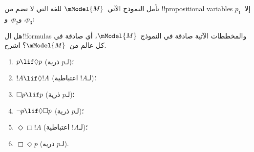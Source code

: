 \documentclass[../../../include/open-logic-section]{subfiles}
\begin{document}
\begin{prob}
  تأمل النموذج الآتي~$\mModel{M}$ للغة التي لا تضم من
  !!{propositional variable}s إلا~$p_1$، و$p_2$، و$p_3$:
  \begin{center}
  \end{center}
  هل ال!!{formula}s والمخططات الآتية صادقة في النموذج~$\mModel{M}$،
  أي صادقة في كل عالم من~$\mModel{M}$؟ اشرح.
  \begin{enumerate}
  \item $p\lif \Diamond p$ (لـ$p$ ذرية)؛
  \item $!A\lif \Diamond !A$ (لـ$!A$ اعتباطية)؛
  \item $\Box p \lif p$ (لـ$p$ ذرية)؛
  \item $\lnot p \lif \Diamond \Box p$ (لـ$p$ ذرية)؛
  \item $\Diamond \Box !A$ (لـ$!A$ اعتباطية)؛
  \item $\Box \Diamond p$ (لـ$p$ ذرية).
  \end{enumerate}
\end{prob}
\end{document}

